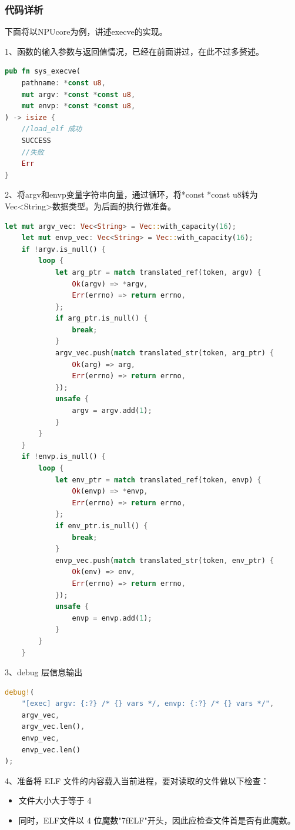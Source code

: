 \subsubsection{代码详析}
下面将以NPUcore为例，讲述execve的实现。

1、函数的输入参数与返回值情况，已经在前面讲过，在此不过多赘述。
\begin{lstlisting}[language={Rust}, 
    caption={execve输入参数与返回值}]
pub fn sys_execve(
    pathname: *const u8,
    mut argv: *const *const u8,
    mut envp: *const *const u8,
) -> isize {
    //load_elf 成功
    SUCCESS
    //失败
    Err
}
\end{lstlisting}
2、将argv和envp变量字符串向量，通过循环，将*const *const u8转为Vec<String>数据类型。为后面的执行做准备。
\begin{lstlisting}[language={Rust}, 
    caption={execve参数转换}]
let mut argv_vec: Vec<String> = Vec::with_capacity(16);
    let mut envp_vec: Vec<String> = Vec::with_capacity(16);
    if !argv.is_null() {
        loop {
            let arg_ptr = match translated_ref(token, argv) {
                Ok(argv) => *argv,
                Err(errno) => return errno,
            };
            if arg_ptr.is_null() {
                break;
            }
            argv_vec.push(match translated_str(token, arg_ptr) {
                Ok(arg) => arg,
                Err(errno) => return errno,
            });
            unsafe {
                argv = argv.add(1);
            }
        }
    }
    if !envp.is_null() {
        loop {
            let env_ptr = match translated_ref(token, envp) {
                Ok(envp) => *envp,
                Err(errno) => return errno,
            };
            if env_ptr.is_null() {
                break;
            }
            envp_vec.push(match translated_str(token, env_ptr) {
                Ok(env) => env,
                Err(errno) => return errno,
            });
            unsafe {
                envp = envp.add(1);
            }
        }
    }
\end{lstlisting}
3、debug 层信息输出
\begin{lstlisting}[language={Rust}, 
    caption={execve的debug信息}]
debug!(
    "[exec] argv: {:?} /* {} vars */, envp: {:?} /* {} vars */",
    argv_vec,
    argv_vec.len(),
    envp_vec,
    envp_vec.len()
);
\end{lstlisting}
4、准备将 ELF 文件的内容载入当前进程，要对读取的文件做以下检查：
\begin{itemize}
    \item 文件大小大于等于 4
    \item 同时，ELF文件以 4 位魔数"7fELF"开头，因此应检查文件首是否有此魔数。 
\end{itemize}

